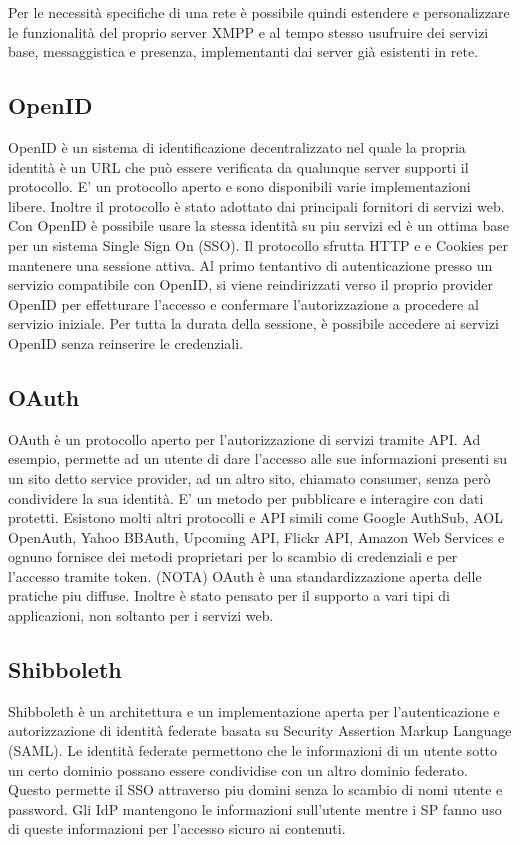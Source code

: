 Per le necessità specifiche di una rete è possibile quindi estendere e
personalizzare le funzionalità del proprio server XMPP e al tempo
stesso usufruire dei servizi base, messaggistica e presenza,
implementanti dai server già esistenti in rete.

\subsection{OpenID}
OpenID è un sistema di identificazione decentralizzato nel quale la
propria identità è un URL che può essere verificata da qualunque
server supporti il protocollo. E' un protocollo aperto e sono
disponibili varie implementazioni libere. Inoltre il protocollo è
stato adottato dai principali fornitori di servizi web. Con OpenID è
possibile usare la stessa identità su piu servizi ed è un ottima base
per un sistema Single Sign On (SSO). Il protocollo sfrutta HTTP e e
Cookies per mantenere una sessione attiva. Al primo tentantivo di
autenticazione presso un servizio compatibile con OpenID, si viene
reindirizzati verso il proprio provider OpenID per effetturare
l'accesso e confermare l'autorizzazione a procedere al servizio
iniziale. Per tutta la durata della sessione, è possibile accedere ai
servizi OpenID senza reinserire le credenziali.

\subsection{OAuth}
OAuth è un protocollo aperto per l'autorizzazione di servizi tramite
API. Ad esempio, permette ad un utente di dare l'accesso alle sue
informazioni presenti su un sito detto service provider, ad un altro
sito, chiamato consumer, senza però condividere la sua identità. E' un
metodo per pubblicare e interagire con dati protetti. Esistono molti
altri protocolli e API simili come Google AuthSub, AOL OpenAuth, Yahoo
BBAuth, Upcoming API, Flickr API, Amazon Web Services e ognuno
fornisce dei metodi proprietari per lo scambio di credenziali e per
l'accesso tramite token. (NOTA) OAuth è una standardizzazione aperta
delle pratiche piu diffuse. Inoltre è stato pensato per il supporto a
vari tipi di applicazioni, non soltanto per i servizi web.


\subsection{Shibboleth}
Shibboleth è un architettura e un implementazione aperta per
l'autenticazione e autorizzazione di identità federate basata su
Security Assertion Markup Language (SAML). Le identità federate
permettono che le informazioni di un utente sotto un certo dominio
possano essere condividise con un altro dominio federato. Questo
permette il SSO attraverso piu domini senza lo scambio di nomi utente
e password. Gli IdP mantengono le informazioni sull'utente mentre i SP
fanno uso di queste informazioni per l'accesso sicuro ai contenuti.

